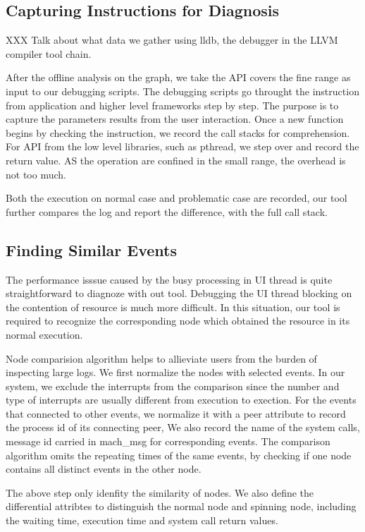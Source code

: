 \subsection{Capturing Instructions for Diagnosis}

XXX Talk about what data we gather using lldb, the debugger in the LLVM compiler tool chain.

After the offline analysis on the graph, we take the API covers the fine range as input to our debugging scripts.
The debugging scripts go throught the instruction from application and higher level frameworks step by step.
The purpose is to capture the parameters results from the user interaction.
Once a new function begins by checking the instruction, we record the call stacks for comprehension. 
For API from the low level libraries, such as pthread, we step over and record the return value.
AS the operation are confined in the small range, the overhead is not too much.

Both the execution on normal case and problematic case are recorded, our tool further compares the log and report
the difference, with the full call stack.

\subsection{Finding Similar Events}

The performance isssue caused by the busy processing in UI thread is quite straightforward to diagnoze with out tool.
Debugging the UI thread blocking on the contention of resource is much more difficult.
In this situation, our tool is required to recognize the corresponding node
which obtained the resource in its normal execution.

Node comparision algorithm helps to allieviate users from the burden of inspecting large logs.
We first normalize the nodes with selected events.
In our system, we exclude the interrupts from the comparison
since the number and type of interrupts are usually different from execution to exection.
For the events that connected to other events, we normalize it with a peer attribute
to record the process id of its connecting peer,
We also record the name of the system calls, message id carried in mach\_msg for corresponding events.
The comparison algorithm omits the repeating times of the same events,
by checking if one node contains all distinct events in the other node.

The above step only idenfity the similarity of nodes.
We also define the differential attribtes to distinguish the normal node and spinning node,
including the waiting time, execution time and system call return values.

